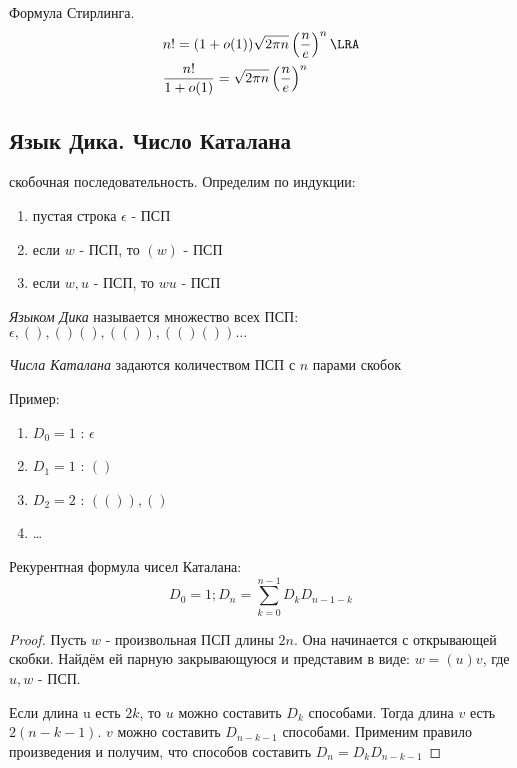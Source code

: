 \documentclass[a4paper, 14pt]{article}
\begin{document}
    \begin{theorem}
        Формула Стирлинга. 
        \begin{align*}
            &n! = (1 + o(1))\sqrt{2\pi n}\left(\frac{n}{e}\right)^n \LRA \\
            &\frac{n!}{1+o(1)} = \sqrt{2\pi n}\left(\frac{n}{e}\right)^n
        \end{align*}
    \end{theorem}

    \subsection*{Язык Дика. Число Каталана}

    \begin{definition}
        { скобочная последовательность}. Определим по индукции:
        \begin{enumerate}
            \item пустая строка $\epsilon$ - ПСП
            \item если $w$ - ПСП, то $(w)$ - ПСП
            \item если $w, u$ - ПСП, то $wu$ - ПСП
        \end{enumerate}
    \end{definition}

    \begin{definition}
        {\it Языком Дика} называется множество всех ПСП:
        $\epsilon, (), ()(), (()), (()()) \dots$
    \end{definition}

    \begin{definition}
        {\it Числа Каталана} задаются количеством ПСП с $n$ парами скобок    
    \end{definition}
    Пример:
    \begin{enumerate}
        \item $D_0 = 1$ : $\epsilon$
        \item $D_1 = 1$ : $()$
        \item $D_2 = 2$ : $(()), ()$
        \item \dots
    \end{enumerate}
    
    \begin{theorem}
        Рекурентная формула чисел Каталана:
        \[D_0 = 1; D_n = \sum_{k=0}^{n-1}D_kD_{n-1-k}\]
    \end{theorem}
    \begin{proof}
        Пусть $w$ - произвольная ПСП длины $2n$. Она начинается
        с открывающей скобки. Найдём ей парную закрывающуюся и представим 
        в виде: $w = (u)v$, где $u, w$ - ПСП.
        
        Если длина u есть $2k$, то $u$ можно составить $D_k$ способами.
        Тогда длина $v$ есть $2(n-k-1)$.   $v$ можно составить $D_{n-k-1}$ способами.
        Применим правило произведения и получим, что способов составить $D_n = D_kD_{n-k-1}$
    \end{proof}
\end{document}
